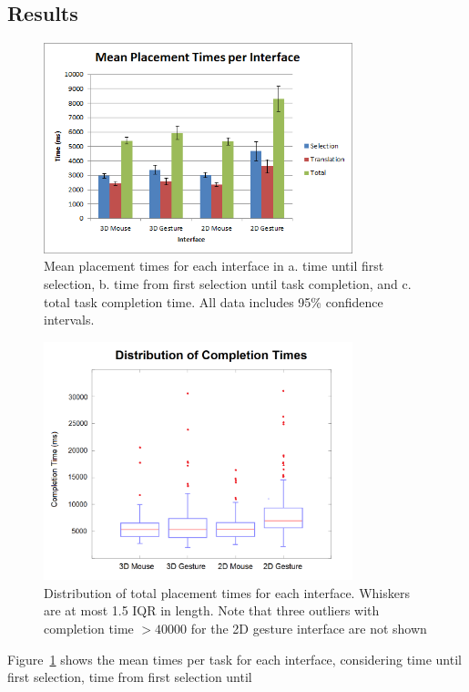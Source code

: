 \documentclass[pageno]{jpaper}
\begin{document}
\subsection{Results}
\begin{figure}
\centering
\includegraphics[width=0.8\textwidth]{figures/aggmean.png}
\caption{Mean placement times for each interface in a. time until first
selection, b. time from first selection until task completion, and c. total task
completion time. All data includes 95\% confidence intervals.}
\label{fig:aggregate}
\end{figure}
\begin{figure}
\centering
\includegraphics[width=0.8\textwidth]{figures/distribution.png}
\caption{Distribution of total placement times for each interface. Whiskers are
 at most 1.5 IQR in length. Note that three outliers with completion time $> 40000$ for the 2D gesture interface are not
shown}
\label{fig:distr}
\end{figure}
Figure~\ref{fig:aggregate} shows the mean times per task for each interface, considering time until first selection, time from first selection until
\end{document}
